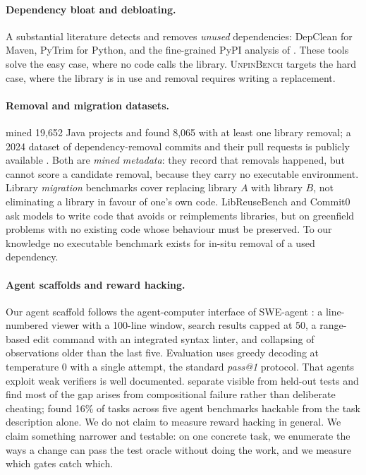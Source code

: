 \documentclass[11pt]{article}
\newcommand{\bench}{\textsc{UnpinBench}}
\begin{document}
\paragraph{Dependency bloat and debloating.}
A substantial literature detects and removes \emph{unused} dependencies: DepClean \citep{soto2021longitudinal} for Maven, PyTrim \citep{pytrim2025} for Python, and the fine-grained PyPI analysis of \citet{drosos2024bloat}.
These tools solve the easy case, where no code calls the library.
\bench{} targets the hard case, where the library is in use and removal requires writing a replacement.

\paragraph{Removal and migration datasets.}
\citet{he2021migration} mined 19,652 Java projects and found 8,065 with at least one library removal; a 2024 dataset of dependency-removal commits and their pull requests is publicly available \citep{jaisri2024dataset}.
Both are \emph{mined metadata}: they record that removals happened, but cannot score a candidate removal, because they carry no executable environment.
Library \emph{migration} benchmarks \citep{pymigbench2023,migrationbench2025} cover replacing library $A$ with library $B$, not eliminating a library in favour of one's own code.
LibReuseBench \citep{libreuse2026} and Commit0 \citep{commit02024} ask models to write code that avoids or reimplements libraries, but on greenfield problems with no existing code whose behaviour must be preserved.
To our knowledge no executable benchmark exists for in-situ removal of a used dependency.

\paragraph{Agent scaffolds and reward hacking.}
Our agent scaffold follows the agent-computer interface of SWE-agent \citep{sweagent2024}: a line-numbered viewer with a 100-line window, search results capped at 50, a range-based edit command with an integrated syntax linter, and collapsing of observations older than the last five.
Evaluation uses greedy decoding at temperature 0 with a single attempt, the standard \textit{pass@1} protocol.
That agents exploit weak verifiers is well documented.
\citet{specbench2026} separate visible from held-out tests and find most of the gap arises from compositional failure rather than deliberate cheating; \citet{hackerfixer2026} found 16\% of tasks across five agent benchmarks hackable from the task description alone.
We do not claim to measure reward hacking in general.
We claim something narrower and testable: on one concrete task, we enumerate the ways a change can pass the test oracle without doing the work, and we measure which gates catch which.
\end{document}
